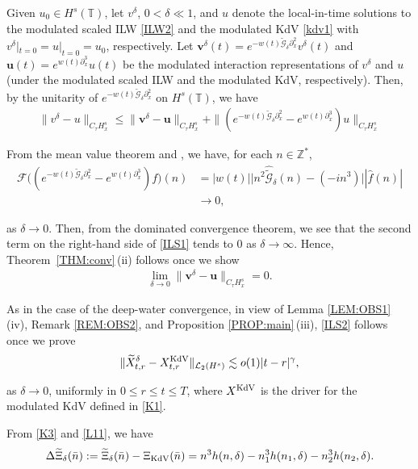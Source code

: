 \documentclass[letterpaper, 11pt,  reqno]{amsart}
\newcommand{\1}{\hspace{0.5mm}\text{I}\hspace{0.5mm}}
\newcommand{\noi}{\noindent}
\newcommand{\Z}{\mathbb{Z}}
\newcommand{\T}{\mathbb{T}}
\newcommand{\F}{\mathcal{F}}
\newcommand{\dl}{\delta}
\newcommand{\Dl}{\Delta}
\newcommand{\g}{\gamma}
\newcommand{\ft}{\widehat}
\newcommand{\wt}{\widetilde}
\newcommand{\dx}{\partial_x}
\newcommand{\Gd}{\wt{\mathcal{G}}_\dl}
\newcommand{\les}{\lesssim}
\newcommand{\cL}{\mathcal{L}}
\newcommand{\uu}{\mathbf{u}}
\newcommand{\vv}{\mathbf{v}}
\newcommand{\KDV}{\text{\rm KdV} }
\newcommand{\too}{\longrightarrow}
\numberwithin{equation}{section}
\numberwithin{theorem}{section}
\begin{document}
Given $u_0 \in H^s (\T)$,
let $v^\dl$, $0<   \dl \ll 1$,  and $u$ denote the local-in-time solutions
to the modulated scaled ILW \eqref{ILW2}
and the modulated KdV \eqref{kdv1}
with $v^\dl|_{t = 0} = u|_{t = 0} = u_0$, respectively.
Let 
$\vv^\dl(t) = e^{- w(t) \Gd \dx^2} v^\dl(t)$
and 
 $\uu(t) = e^{ w(t) \dx^3} u(t)$
be the modulated interaction representations
of $v^\dl$ and $u$ (under the modulated scaled ILW and the modulated KdV, respectively).
Then, by the unitarity of $e^{- w(t) \Gd \dx^2}$ on $H^s(\T)$, we have
\begin{align}
\| v^\dl - u\|_{C_\tau H^s_x}
\le \| \vv^\dl - \uu\|_{C_\tau H^s_x}
+ \| ( e^{ - w(t) \Gd \dx^2} -  e^{ w(t)  \dx^3}) u \|_{C_\tau H^s_x}
\label{ILS1}
\end{align}


\noi
From the mean value theorem and \cite[Lemma 2.3]{LOZ}, we have,
for each $n \in \Z^*$, 
\begin{align*}
 \F\big( (e^{ - w(t) \Gd \dx^2} -  e^{  w(t)  \dx^3}) f \big)(n)
& = 
 |w(t)|\big| n^2 \ft \Gd(n) - (-i n^3) \big|
|\ft f (n)|\\
& \too0,
\end{align*}

\noi
as $\dl \to 0$.
Then, from the dominated convergence theorem, 
we see that the second term on the right-hand side
of \eqref{ILS1} tends to $0$ 
as $\dl \to \infty$.
Hence, 
Theorem~\ref{THM:conv}\,(ii)
follows once we show
\begin{align}
\lim_{\dl \to 0} \| \vv^\dl - \uu\|_{C_\tau H^s_x} = 0.
\label{ILS2}
\end{align}







As in  the case of the deep-water convergence, 
in view of Lemma \ref{LEM:OBS1}\,(iv), Remark \ref{REM:OBS2}, and 
Proposition \ref{PROP:main}\,(iii),
\eqref{ILS2} follows once we  prove
\begin{align}
\|\wt X^{\dl}_{t,r} - X^{\KDV}_{t,r}\|_{\cL_2(H^s)}
\les 
o(1)|t-r|^{\g},
\label{L11a}
\end{align}

\noi
as $\dl\to 0$, 
uniformly in  $0 \le r \le  t \le T$, 
where $X^{\KDV}$
is  the driver for the modulated KdV defined  in \eqref{K1}.







From  \eqref{K3} and \eqref{L11},  we have
\begin{align}
\Dl \wt \Xi_\dl (\bar n): = \wt \Xi_\dl (\bar n) - \Xi_\KDV (\bar n)
 =
n^3 h(n,\dl)  - n_1^3 h(n_1,\dl)   - n_2^3 h(n_2,\dl) .
\label{L11b}
\end{align}
\end{document}
